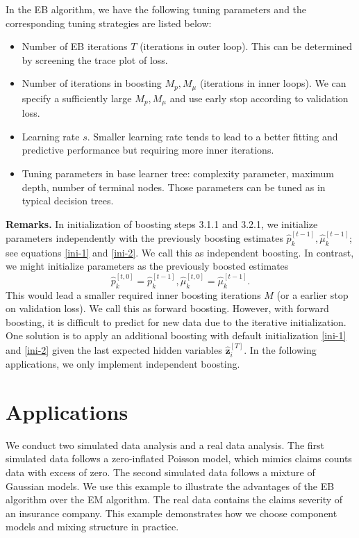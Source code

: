 \documentclass[11pt]{article}
\numberwithin{equation}{section}
\def\bz{\boldsymbol{z}}
\begin{document}
In the EB algorithm, we have the following tuning parameters and the corresponding tuning strategies are listed below:
	\begin{itemize}
		\item Number of EB iterations {$T$} (iterations in outer loop). This can be determined by screening the trace plot of loss.
		\item Number of iterations in boosting {$M_p,M_\mu$} (iterations in inner loops). We can specify a sufficiently large $M_p,M_\mu$ and use  early stop according to validation loss.
		\item Learning rate {$s$}. Smaller learning rate tends to lead to a better fitting and predictive performance but requiring more inner iterations.
		\item Tuning parameters in base learner tree: complexity parameter, maximum depth, number of terminal nodes. Those parameters can be tuned as in typical decision trees.
	\end{itemize}

		
{\bf Remarks.}
	In initialization of boosting steps 3.1.1 and 3.2.1, we initialize parameters {independently} with the previously boosting estimates $\hat{p}_k^{[t-1]}, \hat{\mu}_k^{[t-1]}$; see equations \eqref{ini-1} and \eqref{ini-2}. We call this as independent boosting.
	In contrast, we might initialize parameters as the previously boosted estimates $$\hat{p}_k^{[t,0]}=\hat{p}_k^{[t-1]}, \hat{\mu}_k^{[t,0]}=\hat{\mu}_k^{[t-1]}.$$
		This would lead a {smaller} required inner boosting iterations $M$ (or a {earlier} stop on validation loss). 
	We call this as forward boosting. 
	However, with forward boosting, it is difficult to predict for new data due to the {iterative initialization}. One solution is to apply an additional boosting with default initialization \eqref{ini-1} and \eqref{ini-2} given the {last expected hidden variables $\hat{\bz}_i^{[T]}$}. In the following applications, we only implement independent boosting.
			
\section{Applications}

We conduct two simulated data analysis and a real data analysis. 
The first simulated data follows a zero-inflated Poisson model, which mimics claims counts data with excess of zero.
The second simulated data follows a mixture of Gaussian models. We use this example to illustrate the advantages of the EB algorithm over the EM algorithm.
The real data contains the claims severity of an insurance company. This example demonstrates how we choose component models and mixing structure in practice.
\end{document}
